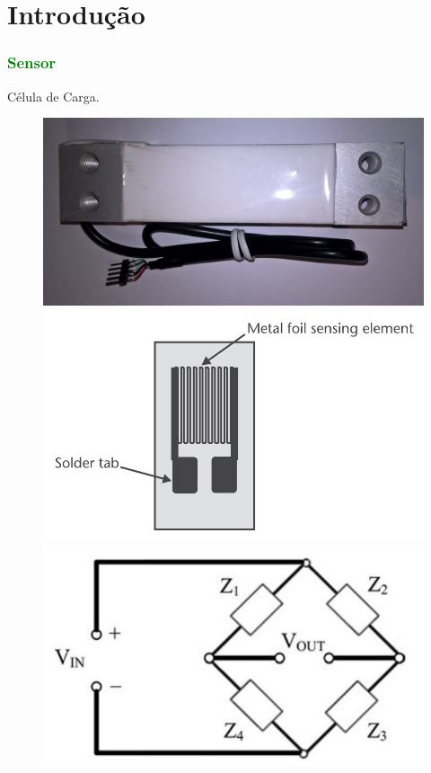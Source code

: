 \section{Introdução}
\begin{frame}
\frametitle{\textcolor{green}{Sensor}}
Célula de Carga.
\begin{figure}[!b]
	\includegraphics[scale=0.08]{./image/PESTA/material/Load_Cell_1.jpg}
	\hspace{.1cm}
	\includegraphics[scale=.1]{./image/PESTA/general/strain_gauge_1.jpg}
	\hspace{.1cm}
	\includegraphics[scale=.3]{./image/PESTA/schematic/Wheatstone_Bridge_1.jpg}

\end{figure}
\end{frame}
